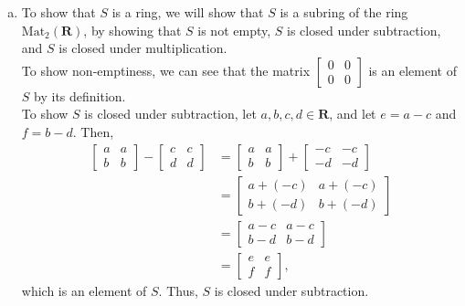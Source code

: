 \documentclass[10pt]{extarticle}
\begin{document}
  \begin{enumerate}[(a)]
    \item To show that $S$ is a ring, we will show that $S$ is a subring of the ring $\text{Mat}_{2}(\mathbf{R})$, by showing that $S$ is not empty, $S$ is closed under subtraction, and $S$ is closed under multiplication.\\

      To show non-emptiness, we can see that the matrix $ \begin{bmatrix}0&0\\0&0\end{bmatrix} $ is an element of $S$ by its definition.\\

      To show $S$ is closed under subtraction, let $a,b,c,d\in \mathbf{R}$, and let $e = a-c$ and $f = b-d$. Then,
      \begin{align*}
        \begin{bmatrix}a&a\\b&b\end{bmatrix} - \begin{bmatrix}c&c\\d&d\end{bmatrix} &= \begin{bmatrix}a&a\\b&b\end{bmatrix} + \begin{bmatrix}-c&-c\\-d&-d\end{bmatrix}\\
                        &= \begin{bmatrix}a+(-c) & a+(-c) \\ b+(-d) & b+(-d)\end{bmatrix}\\
                        &= \begin{bmatrix}a-c&a-c\\b-d&b-d\end{bmatrix}\\
                        &= \begin{bmatrix}e&e\\f&f\end{bmatrix},
      \end{align*}
      which is an element of $S$. Thus, $S$ is closed under subtraction.\\


\end{enumerate}
\end{document}
